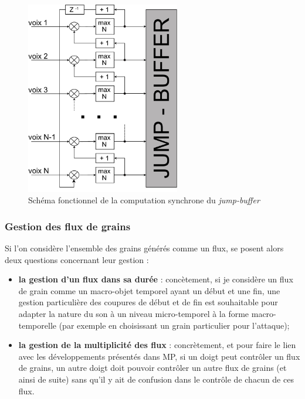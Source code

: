 \begin{figure}[!htbp]
	\captionsetup{format=plain}
	\includegraphics[width=0.6\textwidth]{gfx/04_algorithms/sagrada-jumpBuffer.pdf}
	\caption[Sagrada : schéma fonctionnel de la computation synchrone du \textit{jump-buffer}]{Schéma fonctionnel de la computation synchrone du \textit{jump-buffer}}
	\label{fig:algorithms:sagrada-jumpBuffer}
\end{figure}

\subsubsection{Gestion des flux de grains}

\noindent Si l'on considère l'ensemble des grains générés comme un flux, se posent alors deux questions concernant leur gestion :
\vspace{-1em}
\begin{itemize}[noitemsep]
	\item \textbf{la gestion d'un flux dans sa durée} : concètement, si je considère un flux de grain comme un macro-objet temporel ayant un début et une fin, une gestion particulière des coupures de début et de fin est souhaitable pour adapter la nature du son à un niveau micro-temporel à la forme macro-temporelle (par exemple en choisissant un grain particulier pour l'attaque);
	\item \textbf{la gestion de la multiplicité des flux} : concrètement, et pour faire le lien avec les développements présentés dans MP, si un doigt peut contrôler un flux de grains, un autre doigt doit pouvoir contrôler un autre flux de grains (et ainsi de suite) sans qu'il y ait de confusion dans le contrôle de chacun de ces flux.
\end{itemize}

